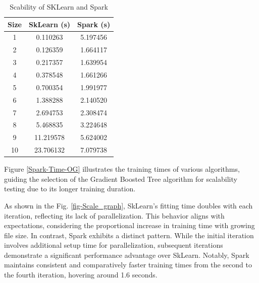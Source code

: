\documentclass[12pt]{report}
\begin{document}



\begin{table}
    \caption{Scability of SKLearn and Spark}
    \label{tab:model-performance-sklearn-spark}
    
    \begin{center}
    \begin{tabular}{|c|c|c|}
    \hline
    \textbf {Size} & \textbf{SkLearn (s)} & \textbf{Spark (s)}   \\ \hline
    1 & 0.110263 & 5.197456  \\ 
    \hline
    2 & 0.126359 & 1.664117  \\ \hline
    3 & 0.217357 & 1.639954  \\ \hline
    4 & 0.378548 & 1.661266  \\ \hline
    5 & 0.700354 & 1.991977  \\ \hline
    6 & 1.388288 & 2.140520  \\ \hline
    7 & 2.694753 & 2.308474  \\ \hline
    8 & 5.468835 & 3.224648  \\ \hline
    9 & 11.219578 & 5.624002  \\ \hline
    10 & 23.706132 & 7.079738  \\ \hline
    
    \end{tabular}
    \end{center}
\end{table}



Figure \ref{Spark-Time-OG} illustrates the training times of various algorithms, guiding the selection of the Gradient Boosted Tree algorithm for scalability testing due to its longer training duration.

As shown in the Fig. \ref{fig-Scale_graph}, SkLearn's fitting time doubles with each iteration, reflecting its lack of parallelization. This behavior aligns with expectations, considering the proportional increase in training time with growing file size. In contrast, Spark exhibits a distinct pattern. While the initial iteration involves additional setup time for parallelization, subsequent iterations demonstrate a significant performance advantage over SkLearn. Notably, Spark maintains consistent and comparatively faster training times from the second to the fourth iteration, hovering around 1.6 seconds.
\end{document}
